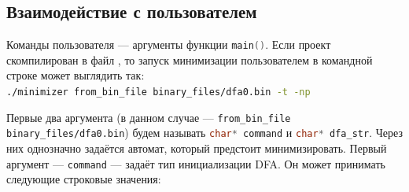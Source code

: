 \documentclass{article}
\begin{document}
\subsection{Взаимодействие с пользователем} \label{p1}
Команды пользователя --- аргументы функции \lstinline[language=C++]!main()!. Если проект скомпилирован в файл , то запуск минимизации пользователем в командной строке может выглядить так:\\
 \lstinline[language=bash]!./minimizer from_bin_file binary_files/dfa0.bin -t -np!

 Первые два аргумента (в данном случае --- \lstinline[language=bash]!from_bin_file binary_files/dfa0.bin!) будем называть \lstinline[language=C++]!char* command! и \lstinline[language=C++]!char* dfa_str!. Через них однозначно задаётся автомат, который предстоит минимизировать. Первый аргумент --- \lstinline[language=C++]!command! --- задаёт тип инициализации DFA. Он может принимать следующие строковые значения:
\end{document}
